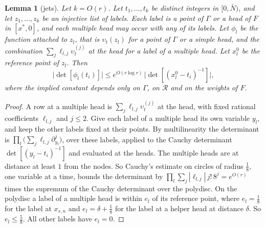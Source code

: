 \documentclass[11pt]{amsart}
\newtheorem{lemma}[theorem]{Lemma}
\theoremstyle{definition}
\theoremstyle{remark}
\numberwithin{equation}{section}
\begin{document}
\begin{lemma}[jets]\label{lem:jet}
Let $k=O(r)$. Let $t_1,\dots,t_k$ be distinct integers in $[0,\bar N)$, and let $z_1,\dots,z_k$ be an injective list of
labels. Each label is a point of $\Gamma$ or a head of $F$ in $[x^*,0]$, and each multiple head may occur with any of
its labels. Let $\phi_l$ be the function attached to $z_l$, that is $\upsilon_t(z_l)$ for a point of $\Gamma$ or a
simple head, and the combination $\sum_j\ell_{l,j}\upsilon_t^{(j)}$ at the head for a label of a multiple head. Let
$x^0_l$ be the reference point of $z_l$. Then
\[
 \bigl|\det[\phi_l(t_i)]\bigr|\le e^{O(r\log r)}\,\bigl|\det[(x^0_l-t_i)^{-1}]\bigr| ,
\]
where the implied constant depends only on $\Gamma$, on $\mathcal R$ and on the weights of $F$.
\end{lemma}
\begin{proof}
A row at a multiple head is $\sum_j\ell_{l,j}\upsilon_t^{(j)}$ at the head, with fixed rational coefficients
$\ell_{l,j}$ and $j\le2$. Give each label of a multiple head its own variable $y_l$, and keep the other labels fixed at
their points. By multilinearity the determinant is $\prod_l\bigl(\sum_j\ell_{l,j}\partial_{y_l}^j\bigr)$, over these labels,
applied to the Cauchy determinant $\det[(y_l-t_i)^{-1}]$ and evaluated at the heads. The multiple heads are at
distance at least $1$ from the nodes. So Cauchy's estimate on circles of radius $\frac18$, one variable at a time,
bounds the determinant by $\prod_l\sum_j|\ell_{l,j}|\,j!\,8^j=e^{O(r)}$ times the supremum of the Cauchy determinant over
the polydisc. On the polydisc a label of a multiple head is within $e_l$ of its reference point, where $e_l=\frac18$ for
the label at $x_{s,n}$ and $e_l=\delta+\frac18$ for the label at a helper head at distance $\delta$. So
$e_l\le\frac58$. All other labels have $e_l=0$.


\end{proof}
\end{document}
